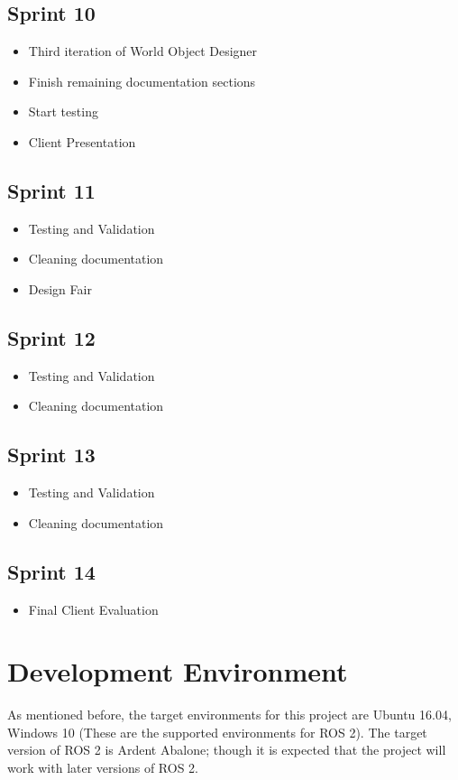\subsection{Sprint 10}
\begin{itemize}
	\item Third iteration of World Object Designer
	\item Finish remaining documentation sections
	\item Start testing
	\item Client Presentation
\end{itemize}

\subsection{Sprint 11}
\begin{itemize}
	\item Testing and Validation
	\item Cleaning documentation
	\item Design Fair
\end{itemize}

\subsection{Sprint 12}
\begin{itemize}
	\item Testing and Validation
	\item Cleaning documentation
\end{itemize}

\subsection{Sprint 13}
\begin{itemize}
	\item Testing and Validation
	\item Cleaning documentation
\end{itemize}

\subsection{Sprint 14}
\begin{itemize}
	\item Final Client Evaluation
\end{itemize}

\section{Development Environment\label{sec:devenv}}
As mentioned before, the target environments for this project are Ubuntu 16.04, Windows 10 (These are the supported environments for ROS 2). The target version of ROS 2 is Ardent Abalone; though it is expected that the project will work with later versions of ROS 2.

